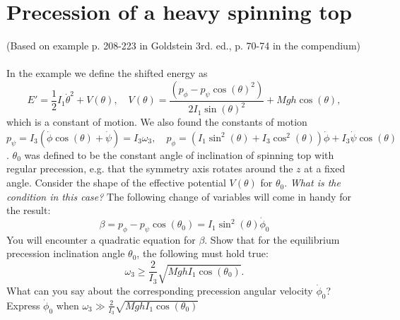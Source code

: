 \documentclass{article}
\begin{document}
    \section{Precession of a heavy spinning top}
    (Based on example p. 208-223 in Goldstein 3rd. ed., p. 70-74 in the compendium)\\ \\
    In the example we define the shifted energy as 
    \begin{equation*}
        E' = \frac{1}{2}I_1 \dot \theta^2 + V(\theta), \quad V(\theta) = \frac{(p_\phi - p_\psi \cos(\theta)^2)}{2I_1\sin(\theta)^2} + Mgh\cos(\theta),
    \end{equation*}
    which is a constant of motion. We also found the constants of motion 
    \begin{equation*}
        p_\psi =  I_3(\dot \phi \cos(\theta) + \dot \psi) = I_3 \omega_3, \quad
        p_\phi = (I_1 \sin^2(\theta) + I_3 \cos^2(\theta)) \dot \phi + I_3 \dot \psi \cos(\theta)
    \end{equation*}. 
    $\theta_0$ was defined to be the constant angle of inclination of spinning top with regular precession, e.g. that the symmetry axis rotates around the $z$ at a fixed angle. Consider the shape of the effective potential $V(\theta)$ for $\theta_0$. \emph{What is the condition in this case?} The following change of variables will come in handy for the result:
    \begin{equation*}
        \beta = p_\phi - p_\psi \cos(\theta_0) = I_1 \sin^2(\theta) \dot \phi_0
    \end{equation*}
    You will encounter a quadratic equation for $\beta$. Show that for the equilibrium precession inclination angle $\theta_0$, the following must hold true:
    \begin{equation*}
        \omega_3 \ge \frac{2}{I_3}\sqrt{MghI_1 \cos(\theta_0) }.
    \end{equation*}
    What can you say about the corresponding precession angular velocity $\dot \phi_0$? Express $\dot \phi_0$ when $\omega_3 \gg \frac{2}{I_3}\sqrt{MghI_1 \cos(\theta_0) }$
\end{document}
